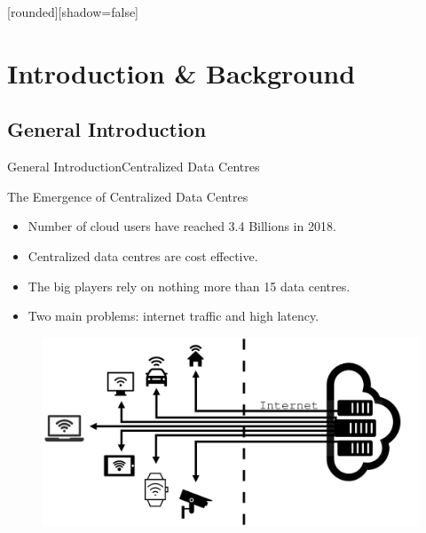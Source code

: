 [rounded][shadow=false]

\section{Introduction \& Background}
\subsection{General Introduction}
\addtocounter{framenumber}{-1}
\begin{withoutheadline}
\begin{frame}{General Introduction}{Centralized Data Centres}

\begin{block}{ The Emergence of Centralized Data Centres}
    \begin{itemize}
    \item  Number of cloud users have reached 3.4 Billions in 2018.
    \item Centralized data centres are cost effective. 
    \item The big players rely on nothing more than 15 data centres. 
    \item<2-> Two main problems: internet traffic and high latency.  
    \end{itemize}
\end{block}



\begin{figure}[p]

\includegraphics[width=0.8\linewidth]{figures/cloud.png}
  
\end{figure}
\end{frame}
\end{withoutheadline}


